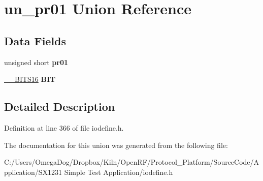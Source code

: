 \hypertarget{unionun__pr01}{\section{un\-\_\-pr01 Union Reference}
\label{unionun__pr01}
}
\subsection*{Data Fields}
\begin{DoxyCompactItemize}
\item 
\hypertarget{unionun__pr01_a69eb2530e3b9d66507ca2b11235c5a8f}{unsigned short {\bfseries pr01}}\label{unionun__pr01_a69eb2530e3b9d66507ca2b11235c5a8f}

\item 
\hypertarget{unionun__pr01_a7db57df137c5c1b17cc82c63740ff9b6}{\hyperlink{struct_____b_i_t_s16}{\-\_\-\-\_\-\-B\-I\-T\-S16} {\bfseries B\-I\-T}}\label{unionun__pr01_a7db57df137c5c1b17cc82c63740ff9b6}

\end{DoxyCompactItemize}


\subsection{Detailed Description}


Definition at line 366 of file iodefine.\-h.



The documentation for this union was generated from the following file\-:\begin{DoxyCompactItemize}
\item 
C\-:/\-Users/\-Omega\-Dog/\-Dropbox/\-Kiln/\-Open\-R\-F/\-Protocol\-\_\-\-Platform/\-Source\-Code/\-Application/\-S\-X1231 Simple Test Application/iodefine.\-h\end{DoxyCompactItemize}
